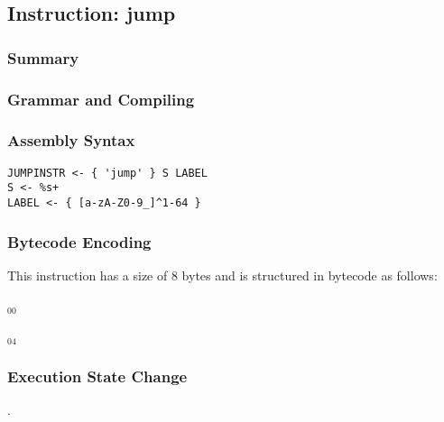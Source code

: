 \subsection{Instruction: jump}

\subsubsection{Summary}


\subsubsection{Grammar and Compiling}


\subsubsection{Assembly Syntax}

\begin{myquote}
\begin{verbatim}
JUMPINSTR <- { 'jump' } S LABEL
S <- %s+
LABEL <- { [a-zA-Z0-9_]^1-64 }
\end{verbatim}
\end{myquote}

\subsubsection{Bytecode Encoding}

This instruction has a size of 8 bytes and is structured in bytecode as follows:

$_{00}$\ 



$_{04}$\ 


\subsubsection{Execution State Change}

.


